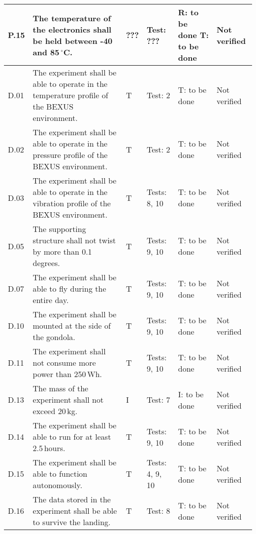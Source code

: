 \begin{longtable}[]{|m{}| m{}|m{}|m{}|m{}|m{}|}
\rowcolor{yellow} P.15 & The temperature of the electronics shall be held between -40 and 85\,$^\circ$C.
& ??? & Test: ??? & R: to be done \newline T: to be done & Not verified \\\hline



D.01 & The experiment shall be able to operate in the temperature profile of the BEXUS environment.
& T & Test: 2 & T: to be done & Not verified \\\hline

D.02 & The experiment shall be able to operate in the pressure profile of the BEXUS environment.
& T & Test: 2  & T: to be done & Not verified \\\hline

D.03 & The experiment shall be able to operate in the vibration profile of the BEXUS environment.
& T & Tests: 8, 10 & T: to be done & Not verified \\\hline

D.05 & The supporting structure shall not twist by more than 0.1\,degrees.
& T & Tests: 9, 10 & T: to be done & Not verified \\\hline

D.07 & The experiment shall be able to fly during the entire day.
& T & Tests: 9, 10 & T: to be done & Not verified \\\hline

D.10 & The experiment shall be mounted at the side of the gondola.
& T & Tests: 9, 10 & T: to be done & Not verified \\\hline

D.11 & The experiment shall not consume more power than 250\,Wh.
& T & Tests: 9, 10 & T: to be done & Not verified \\\hline

D.13 & The mass of the experiment shall not exceed 20\,kg.
& I & Test: 7 & I: to be done & Not verified \\\hline

D.14 & The experiment shall be able to run for at least 2.5\,hours.
& T & Tests: 9, 10 & T: to be done & Not verified \\\hline

D.15 & The experiment shall be able to function autonomously.
& T & Tests: 4, 9, 10 & T: to be done & Not verified \\\hline

D.16 & The data stored in the experiment shall be able to survive the landing.
& T & Test: 8 & T: to be done & Not verified \\\hline


\end{longtable}

